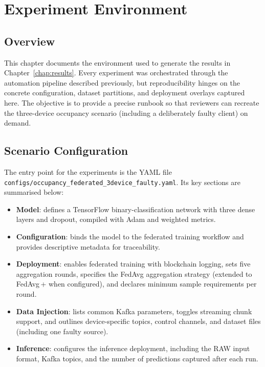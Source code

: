 \chapter{Experiment Environment}
\label{chap:environment}

\section{Overview}

This chapter documents the environment used to generate the results in Chapter~\ref{chap:results}. Every experiment was orchestrated through the automation pipeline described previously, but reproducibility hinges on the concrete configuration, dataset partitions, and deployment overlays captured here. The objective is to provide a precise runbook so that reviewers can recreate the three-device occupancy scenario (including a deliberately faulty client) on demand.

\section{Scenario Configuration}
\label{sec:scenario_config}

The entry point for the experiments is the YAML file \texttt{configs/occupancy\_federated\_3device\_faulty.yaml}. Its key sections are summarised below:

\begin{itemize}
    \item \textbf{Model}: defines a TensorFlow binary-classification network with three dense layers and dropout, compiled with Adam and weighted metrics.
    \item \textbf{Configuration}: binds the model to the federated training workflow and provides descriptive metadata for traceability.
    \item \textbf{Deployment}: enables federated training with blockchain logging, sets five aggregation rounds, specifies the FedAvg aggregation strategy (extended to FedAvg\,+ when configured), and declares minimum sample requirements per round.
\item \textbf{Data Injection}: lists common Kafka parameters, toggles streaming chunk support, and outlines device-specific topics, control channels, and dataset files (including one faulty source).
    \item \textbf{Inference}: configures the inference deployment, including the RAW input format, Kafka topics, and the number of predictions captured after each run.
\end{itemize}

